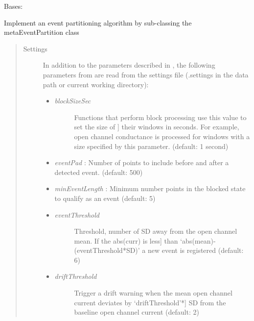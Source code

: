 \documentclass[letterpaper,10pt,english]{sphinxmanual}
\begin{document}
\begin{fulllineitems}
\label{api-doc/mosaic.partition:mosaic.eventSegment.eventSegment}
Bases: {\hyperref[api\string-doc/mosaic.meta:mosaic.metaEventPartition.metaEventPartition]{\emph{}}}

Implement an event partitioning algorithm by sub-classing the metaEventPartition class
\begin{quote}\begin{description}
\item[{Settings}] \leavevmode
In addition to the parameters described in , the following parameters from are read from the settings file (.settings in the data path or current working directory):
\begin{itemize}
\item {} \begin{description}
\item[{\emph{blockSizeSec}}] \leavevmode{[}Functions that perform block processing use this value to set the size of {]}
their windows in seconds. For example, open channel conductance is processed
for windows with a size specified by this parameter. (default: 1 second)

\end{description}

\item {} 
\emph{eventPad} :          Number of points to include before and after a detected event. (default: 500)

\item {} 
\emph{minEventLength} :    Minimum number points in the blocked state to qualify as an event (default: 5)

\item {} \begin{description}
\item[{\emph{eventThreshold}}] \leavevmode{[}Threshold, number of SD away from the open channel mean. If the abs(curr) is less{]}
than `abs(mean)-(eventThreshold*SD)' a new event is registered (default: 6)

\end{description}

\item {} \begin{description}
\item[{\emph{driftThreshold}}] \leavevmode{[}Trigger a drift warning when the mean open channel current deviates by `driftThreshold'*{]}
SD from the baseline open channel current (default: 2)


\end{description}
\end{itemize}
\end{description}
\end{quote}
\end{fulllineitems}
\end{document}
